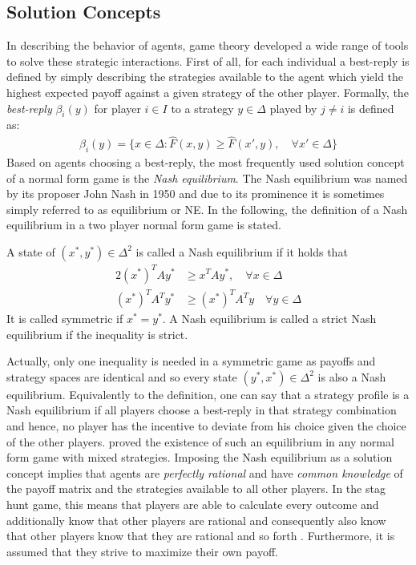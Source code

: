 \subsection{Solution Concepts}
\label{sec:traditionalconcepts}
In describing the behavior of agents, game theory developed a wide range of 
tools to solve these strategic interactions. First of all, for each individual
a best-reply is defined by simply describing the strategies available to the
agent which yield the highest expected payoff against a given 
strategy of the other player.
Formally, the \textit{best-reply} $\beta_i(y)$ for player $i \in I$ to a 
strategy $y \in \Delta$ played by $j \neq i$ is defined as:
\begin{align}
        \label{eq:bestreply}
        \beta_i(y) = \{x \in \Delta: \hat{F}(x,y) \geq \hat{F}(x',y), 
        \quad \forall x' \in \Delta\}
\end{align}
Based on agents choosing a best-reply, the most frequently 
used solution concept of
a normal form game is the \textit{Nash equilibrium}.
The Nash equilibrium was named by its proposer John Nash in 1950 
and due to its prominence it is sometimes simply referred to as equilibrium 
or NE.
In the following, the definition of a Nash equilibrium in a two
player normal form game is stated. 
\begin{mydef}
        \label{def:nashequilibrium}
        A state of $(x^*,y^*) \in \Delta^2$ is called a Nash equilibrium if 
        it holds that
        \begin{alignat*}{2}
                (x^*)^T A y^* &\geq x^T A y^*, \quad \forall x \in \Delta  \\
                (x^*)^T A^T y^* &\geq (x^*)^T A^T y \quad \forall y \in \Delta
        \end{alignat*}
It is called symmetric if $x^* = y^*$. A Nash equilibrium is called a 
strict Nash equilibrium if the inequality is strict.
\end{mydef}
Actually, only one inequality is needed in a symmetric game as payoffs
and strategy spaces are identical and so every state $(y^*,x^*) \in \Delta^2$ 
is also a Nash equilibrium.
Equivalently to the definition, one can say that a strategy profile 
is a Nash equilibrium if all players choose a best-reply in that strategy 
combination and hence, no player has the incentive to deviate from his 
choice given the choice of the other players.
\textcite{nash_equilibrium_1950} proved the existence of such 
an equilibrium in any normal form game with mixed strategies. 
Imposing the Nash equilibrium as a solution concept implies that 
agents are \textit{perfectly rational} and have \textit{common knowledge} 
of the payoff matrix and the strategies available to all other players. 
In the stag hunt game, this means that players are able to calculate every
outcome and additionally know that other players are rational and 
consequently also know that other players know that 
they are rational and so forth \parencite{fudenberg_theory_1998}. 
Furthermore, it is assumed that they strive to maximize their own payoff.

